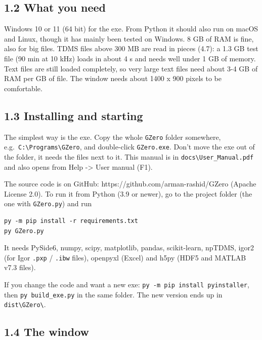 \documentclass[
  11pt,
  a4paper,
]{article}
\begin{document}
\hypertarget{what-you-need}{%
\subsection{1.2 What you need}\label{what-you-need}}

Windows 10 or 11 (64 bit) for the exe. From Python it should also run on
macOS and Linux, though it has mainly been tested on Windows. 8 GB of
RAM is fine, also for big files. TDMS files above 300 MB are read in
pieces (4.7): a 1.3 GB test file (90 min at 10 kHz) loads in about 4 s
and needs well under 1 GB of memory. Text files are still loaded
completely, so very large text files need about 3-4 GB of RAM per GB of
file. The window needs about 1400 x 900 pixels to be comfortable.

\hypertarget{installing-and-starting}{%
\subsection{1.3 Installing and starting}\label{installing-and-starting}}

The simplest way is the exe. Copy the whole \texttt{GZero} folder
somewhere,
e.g.~\texttt{C:\textbackslash{}Programs\textbackslash{}GZero}, and
double-click \texttt{GZero.exe}. Don't move the exe out of the folder,
it needs the files next to it. This manual is in
\texttt{docs\textbackslash{}User\_\allowbreak{}Manual.pdf} and also
opens from Help -\textgreater{} User manual (F1).

The source code is on GitHub: https://github.com/arman-rashid/GZero
(Apache License 2.0). To run it from Python (3.9 or newer), go to the
project folder (the one with \texttt{GZero.py}) and run

\begin{verbatim}
py -m pip install -r requirements.txt
py GZero.py
\end{verbatim}

It needs PySide6, numpy, scipy, matplotlib, pandas, scikit-learn,
npTDMS, igor2 (for Igor \texttt{.pxp} / \texttt{.ibw} files), openpyxl
(Excel) and h5py (HDF5 and MATLAB v7.3 files).

If you change the code and want a new exe:
\texttt{py -m pip install pyinstaller}, then
\texttt{py build\_\allowbreak{}exe.py} in the same folder. The new
version ends up in \texttt{dist\textbackslash{}GZero\textbackslash{}}.

\hypertarget{the-window}{%
\subsection{1.4 The window}\label{the-window}}
\end{document}

